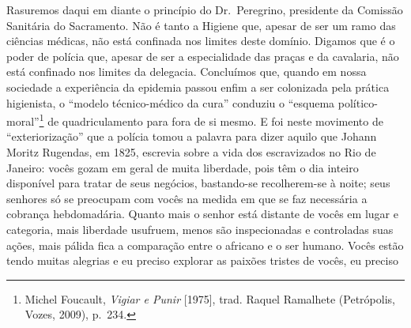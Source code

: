 Rasuremos daqui em diante o princípio do Dr.~Peregrino, presidente da
Comissão Sanitária do Sacramento. Não é tanto a Higiene que, apesar de
ser um ramo das ciências médicas, não está confinada nos limites deste
domínio. Digamos que é o poder de polícia que, apesar de ser a
especialidade das praças e da cavalaria, não está confinado nos limites
da delegacia. Concluímos que, quando em nossa sociedade a experiência da
epidemia passou enfim a ser colonizada pela prática higienista, o
``modelo técnico-médico da cura'' conduziu o ``esquema
político-moral''\footnote{Michel Foucault, \textit{Vigiar e Punir}
  {[}1975{]}, trad. Raquel Ramalhete (Petrópolis, Vozes, 2009), p.~234.}
de quadriculamento para fora de si mesmo. E foi neste movimento de
``exteriorização'' que a polícia tomou a palavra para dizer aquilo que
Johann Moritz Rugendas, em 1825, escrevia sobre a vida dos escravizados
no Rio de Janeiro: vocês gozam em geral de muita liberdade, pois têm o
dia inteiro disponível para tratar de seus negócios, bastando-se
recolherem-se à noite; seus senhores só se preocupam com vocês na medida
em que se faz necessária a cobrança hebdomadária. Quanto mais o senhor
está distante de vocês em lugar e categoria, mais liberdade usufruem,
menos são inspecionadas e controladas suas ações, mais pálida fica a
comparação entre o africano e o ser humano. Vocês estão tendo muitas
alegrias e eu preciso explorar as paixões tristes de vocês, eu preciso
